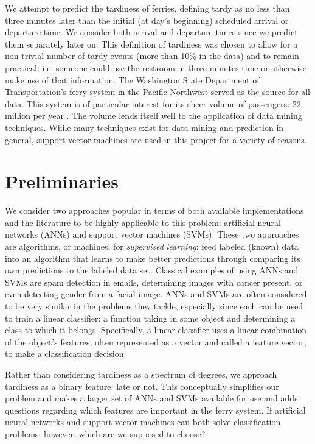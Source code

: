 \documentclass[11pt]{article} %
\begin{document}
We attempt to predict the tardiness of ferries, defining tardy 
as no less than three minutes later than the initial (at day's beginning) 
scheduled arrival or departure time. We consider both arrival and departure 
times since we predict them separately later on. This definition
of tardiness was chosen to allow for a non-trivial number of tardy events 
(more than 10\% in the data) and to remain practical: i.e. someone could use the
restroom in three minutes time or otherwise make use of that information. The 
Washington State Department of Transportation's ferry system in the Pacific
Northwest served as the source for all data. This system is of 
particular interest for its sheer volume of passengers: 22 million per year 
\cite{wsfTraffic}.  The volume lends itself well to the application of 
data mining techniques. While many techniques exist for data mining and 
prediction in general, support vector machines are used in this project for a 
variety of reasons.


\section{Preliminaries}
\label{sec:prelims}
We consider two approaches popular in terms of both available implementations and 
the literature to be highly applicable to this problem:
artificial neural networks (ANNs) and support vector machines (SVMs). These two 
approaches are algorithms, or machines, for
\textit{supervised learning}: feed labeled (known) data into an
algorithm that learns to make better predictions through comparing its own 
predictions to the labeled data set. Classical examples of using ANNs and SVMs are
spam detection in emails, determining images with cancer present, or even
detecting gender from a facial image. ANNs and SVMs are often considered to be
very similar in the problems they tackle, especially since each can
be used to train a linear classifier: a function taking in some object and 
determining a class to which it belongs. Specifically, a linear classifier uses
a linear combination of the object's features, often represented as a vector and
called a feature vector, to make a classification decision.

Rather than considering tardiness as a 
spectrum of degrees, we approach tardiness as a binary feature: late or not. This 
conceptually simplifies our problem and makes a larger set of ANNs and SVMs 
available for use and adds questions regarding which features are important in 
the ferry system. 
If artificial neural networks and support vector machines 
can both solve classification problems, however, which are we supposed to choose?
\end{document}
